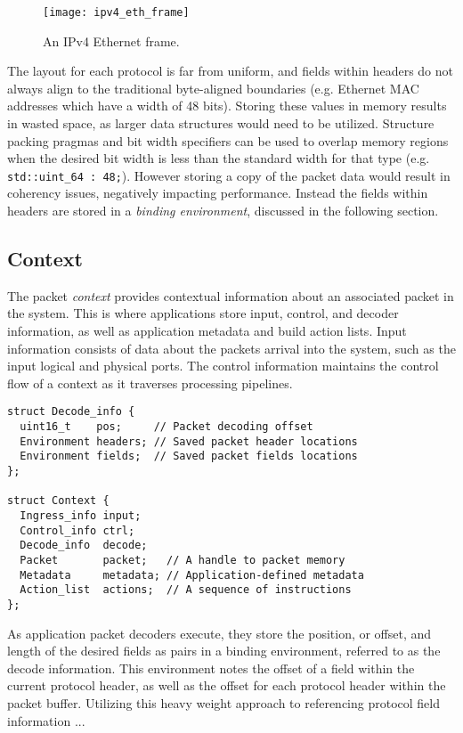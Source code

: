 \begin{figure}[h]
\centering
\texttt{[image: ipv4\_eth\_frame]}
\caption{An IPv4 Ethernet frame.}
\label{ipv4_eth_frame}
\end{figure}

The layout for each protocol is far from uniform, and fields within headers do
not always align to the traditional byte-aligned boundaries (e.g. Ethernet
MAC addresses which have a width of 48 bits). Storing these values in memory
results in wasted space, as larger data structures would need to be utilized.
Structure packing pragmas and bit width specifiers can be used to overlap
memory regions when the desired bit width is less than the standard width for
that type (e.g. \lstinline{std::uint_64 : 48;}). However storing a copy of the
packet data would result in coherency issues, negatively impacting
performance. Instead the fields within headers are stored in a \emph{binding
environment}, discussed in the following section.

\subsection{Context}
The packet \emph{context} provides contextual information about an associated
packet in the system. This is where applications store input, control, and
decoder information, as well as application metadata and build action lists.
Input information consists of data about the packets arrival into the system,
such as the input logical and physical ports. The control information maintains
the control flow of a context as it traverses processing pipelines.

\begin{lstlisting}
struct Decode_info {
  uint16_t    pos;     // Packet decoding offset
  Environment headers; // Saved packet header locations
  Environment fields;  // Saved packet fields locations
};

struct Context {
  Ingress_info input;
  Control_info ctrl;
  Decode_info  decode;
  Packet       packet;   // A handle to packet memory
  Metadata     metadata; // Application-defined metadata
  Action_list  actions;  // A sequence of instructions
};
\end{lstlisting}

As application packet decoders execute, they store the position, or offset, and
length of the desired fields as pairs in a binding environment, referred to as
the decode information. This environment notes the offset of a field within the
current protocol header, as well as the offset for each protocol header within
the packet buffer. Utilizing this heavy weight approach to referencing protocol
field information ...

